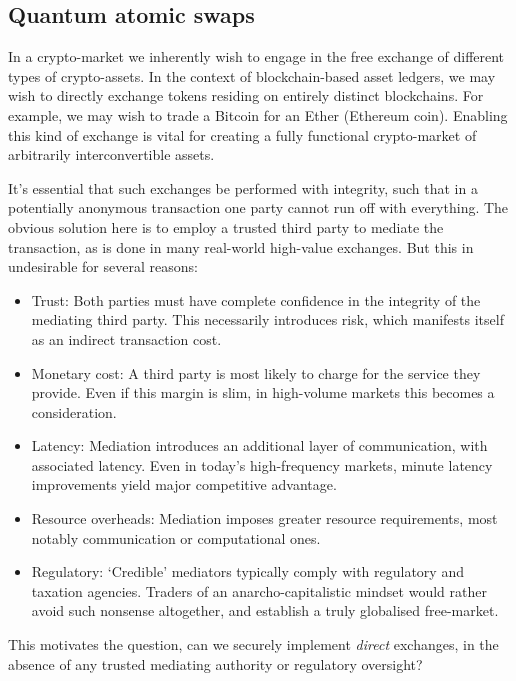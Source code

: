 
\subsection{Quantum atomic swaps}\label{sec:quantum_atomic_swaps}

In a crypto-market we inherently wish to engage in the free exchange of different types of crypto-assets. In the context of blockchain-based asset ledgers, we may wish to directly exchange tokens residing on entirely distinct blockchains. For example, we may wish to trade a Bitcoin for an Ether (Ethereum coin). Enabling this kind of exchange is vital for creating a fully functional crypto-market of arbitrarily interconvertible assets.

It's essential that such exchanges be performed with integrity, such that in a potentially anonymous transaction one party cannot run off with everything. The obvious solution here is to employ a trusted third party to mediate the transaction, as is done in many real-world high-value exchanges. But this in undesirable for several reasons:
\begin{itemize}
\item Trust: Both parties must have complete confidence in the integrity of the mediating third party. This necessarily introduces risk, which manifests itself as an indirect transaction cost.
\item Monetary cost: A third party is most likely to charge for the service they provide. Even if this margin is slim, in high-volume markets this becomes a consideration.
\item Latency: Mediation introduces an additional layer of communication, with associated latency. Even in today's high-frequency markets, minute latency improvements yield major competitive advantage.
\item Resource overheads: Mediation imposes greater resource requirements, most notably communication or computational ones.
\item Regulatory: `Credible' mediators typically comply with regulatory and taxation agencies. Traders of an anarcho-capitalistic mindset would rather avoid such nonsense altogether, and establish a truly globalised free-market.
\end{itemize}
This motivates the question, can we securely implement \textit{direct} exchanges, in the absence of any trusted mediating authority or regulatory oversight?


